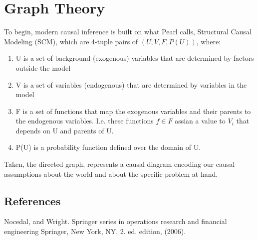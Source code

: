 \documentclass[class=article, crop=false]{standalone}
\theoremstyle{definition}
\theoremstyle{remark}
\theoremstyle{lemma}
\theoremstyle{theorem}
\theoremstyle{corollary}
\theoremstyle{property}
\begin{document}
\section{Graph Theory}
	To begin, modern causal inference is built on what Pearl calls, Structural Causal Modeling (SCM), which are 4-tuple pairs of $(U, V, F, P(U))$, where:

	\begin{enumerate}
		\item U is a set of background (exogenous) variables that are determined by factors outside the model
		\item V is a set of variables (endogenous) that are determined by variables in the model
		\item F is a set of functions that map the exogenous variables and their parents to the endogenous variables. I.e. these functions $f \in F$ assian a value to $V_i$ that depends on U and parents of U.
		\item P(U) is a probability function defined over the domain of U.
	\end{enumerate}

	Taken, the directed graph, represents a causal diagram encoding our causal assumptions about the world and about the specific problem at hand.

	\subsection{References}
		Nocedal, and Wright. Springer series in operations research and financial engineering Springer, New York, NY, 2. ed. edition, (2006).
\end{document}
